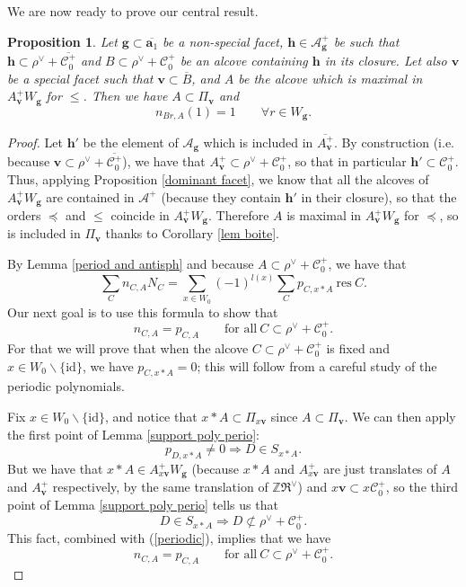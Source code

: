 \documentclass[11pt]{amsart}
\theoremstyle{plain}
\newtheorem{prop}[thm]{Proposition}
\theoremstyle{remark}
\numberwithin{equation}{section}
\begin{document}
	We are now ready to prove our central result.
	\begin{prop}\label{generic poly} 
		Let $\mathbf{g}\subset\overline{\mathbf{a}_1}$ be a non-special facet, $\mathbf{h}\in\mathcal{A}_\mathbf{g}^+$ be such that $\mathbf{h}\subset\rho^\vee+\overline{\mathscr{C}^+_0}$ and $B\subset\rho^\vee+\mathscr{C}^+_0$ be an alcove containing $\mathbf{h}$ in its closure. Let also $\mathbf{v}$ be a special facet such that $\mathbf{v}\subset\overline{B}$, and $A$ be the alcove which is maximal in $A^+_\mathbf{v}W_\mathbf{g}$ for $\leq$. Then we have $A\subset \Pi_\mathbf{v}$ and  
		$$n_{Br,A}(1)=1\qquad \forall r\in W_\mathbf{g}.$$
	\end{prop}
	\begin{proof}
		Let $\mathbf{h}'$ be the element of $\mathcal{A}_\mathbf{g}$ which is included in $\overline{A^+_\mathbf{v}}$. By construction (i.e. because $\mathbf{v}\subset\rho^\vee+\overline{\mathscr{C}_0^+}$), we have that $A^+_\mathbf{v}\subset\rho^\vee+\mathscr{C}^+_0$, so that in particular $\mathbf{h}'\subset \mathscr{C}^+_0$. Thus, applying Proposition \ref{dominant facet}, we know that all the alcoves of $A^+_\mathbf{v}W_\mathbf{g}$ are contained in $\mathcal{A}^+$ (because they contain $\mathbf{h}'$ in their closure), so that the orders $\preceq$ and $\leq$ coincide in $A^+_\mathbf{v}W_\mathbf{g}$. Therefore $A$ is maximal in $A^+_\mathbf{v}W_\mathbf{g}$ for $\preceq$, so is included in $\Pi_\mathbf{v}$ thanks to Corollary \ref{lem boite}.
		
		By Lemma \ref{period and antisph} and because $A\subset \rho^\vee+\mathscr{C}^+_0$, we have that
		\begin{equation}\label{periodic}
			\sum_{C}n_{C,A}N_C=\sum_{x\in W_0}(-1)^{l(x)}\sum_{C}p_{C,x\ast A}~\mathrm{res}~C. 
		\end{equation}
		Our next goal is to use this formula to show that
		$$ n_{C,A}=p_{C,A}\qquad\text{for all}~C\subset  \rho^\vee+\mathscr{C}^+_0. $$
		For that we will prove that when the alcove $C\subset  \rho^\vee+\mathscr{C}^+_0$ is fixed and $x\in W_0\backslash\{\mathrm{id}\}$, we have $p_{C,x\ast A}=0$; this will follow from a careful study of the periodic polynomials. 
		
		Fix $x\in W_0\backslash\{\mathrm{id}\}$, and notice that $x\ast A\subset \Pi_{x\mathbf{v}}$ since $A\subset \Pi_\mathbf{v}$. We can then apply the first point of Lemma \ref{support poly perio}:
		$$p_{D,x\ast A}\neq 0 \Longrightarrow D\in S_{x\ast A}.$$
		But we have that $x\ast A\in A^+_{x\mathbf{v}}W_\mathbf{g}$ (because $x\ast A$ and $A^+_{x\mathbf{v}}$ are just translates of $A$ and $A^+_{\mathbf{v}}$ respectively, by the same translation of $\mathbb{Z}\mathfrak{R}^\vee$) and $x\mathbf{v}\subset x\mathscr{C}^+_0$, so the third point of Lemma \ref{support poly perio} tells us that 
		$$D\in S_{x\ast A}\Rightarrow D\not\subset  \rho^\vee+\mathscr{C}^+_0.$$
		This fact, combined with (\ref{periodic}), implies that we have 
		\begin{equation}\label{periodic vs antisph}
			n_{C,A}=p_{C,A}\qquad\text{for all}~C\subset  \rho^\vee+\mathscr{C}^+_0.
		\end{equation}
		

\end{proof}
\end{document}
